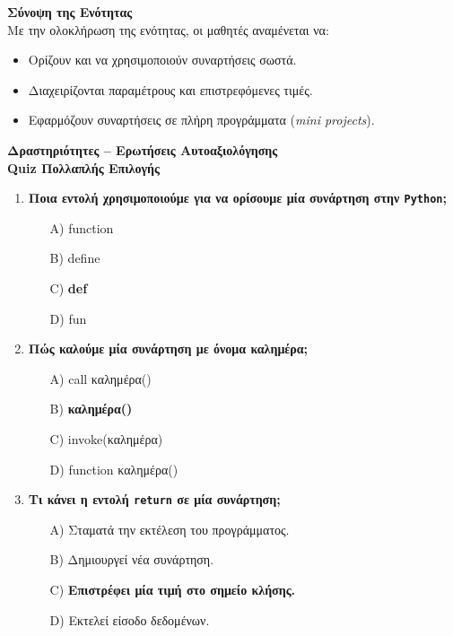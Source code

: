 \documentclass[11pt]{report}
\begin{document}
\vspace{1em}
\textbf{Σύνοψη της Ενότητας} \\[0.5em]
Με την ολοκλήρωση της ενότητας, οι μαθητές αναμένεται να:
\begin{itemize}
    \item Ορίζουν και να χρησιμοποιούν συναρτήσεις σωστά.
    \item Διαχειρίζονται παραμέτρους και επιστρεφόμενες τιμές.
    \item Εφαρμόζουν συναρτήσεις σε πλήρη προγράμματα (\textit{mini projects}).
\end{itemize}

\vspace{1em}
\textbf{Δραστηριότητες – Ερωτήσεις Αυτοαξιολόγησης} \\[0.5em]
\textbf{Quiz Πολλαπλής Επιλογής}
\begin{enumerate}
    \item \textbf{Ποια εντολή χρησιμοποιούμε για να ορίσουμε μία συνάρτηση στην \texttt{Python};}
    \begin{itemize}
        \item[A)] function
        \item[B)] define
        \item[C)] \textbf{def}
        \item[D)] fun
    \end{itemize}
    \item \textbf{Πώς καλούμε μία συνάρτηση με όνομα καλημέρα;}
    \begin{itemize}
        \item[A)] call καλημέρα()
        \item[B)] \textbf{καλημέρα()}
        \item[C)] invoke(καλημέρα)
        \item[D)] function καλημέρα()
    \end{itemize}
    \item \textbf{Τι κάνει η εντολή \texttt{return} σε μία συνάρτηση;}
    \begin{itemize}
        \item[A)] Σταματά την εκτέλεση του προγράμματος.
        \item[B)] Δημιουργεί νέα συνάρτηση.
        \item[C)] \textbf{Επιστρέφει μία τιμή στο σημείο κλήσης.}
        \item[D)] Εκτελεί είσοδο δεδομένων.
    \end{itemize}
\end{enumerate}
\end{document}
